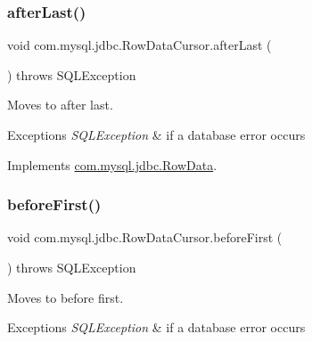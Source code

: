 \mbox{\label{classcom_1_1mysql_1_1jdbc_1_1_row_data_cursor_a047166ec355bf9ee581c9e1a794bda69}} 
\subsubsection{\texorpdfstring{after\+Last()}{afterLast()}}
{\footnotesize\ttfamily void com.\+mysql.\+jdbc.\+Row\+Data\+Cursor.\+after\+Last (\begin{DoxyParamCaption}{ }\end{DoxyParamCaption}) throws S\+Q\+L\+Exception}

Moves to after last.


\begin{DoxyExceptions}{Exceptions}
{\em S\+Q\+L\+Exception} & if a database error occurs \\
\hline
\end{DoxyExceptions}


Implements \mbox{\hyperlink{interfacecom_1_1mysql_1_1jdbc_1_1_row_data_a465a997f2fddb9de5ee12340944084fc}{com.\+mysql.\+jdbc.\+Row\+Data}}.

\mbox{\label{classcom_1_1mysql_1_1jdbc_1_1_row_data_cursor_abdc75072380b9002e7011451143527c4}} 
\subsubsection{\texorpdfstring{before\+First()}{beforeFirst()}}
{\footnotesize\ttfamily void com.\+mysql.\+jdbc.\+Row\+Data\+Cursor.\+before\+First (\begin{DoxyParamCaption}{ }\end{DoxyParamCaption}) throws S\+Q\+L\+Exception}

Moves to before first.


\begin{DoxyExceptions}{Exceptions}
{\em S\+Q\+L\+Exception} & if a database error occurs \\
\hline
\end{DoxyExceptions}


